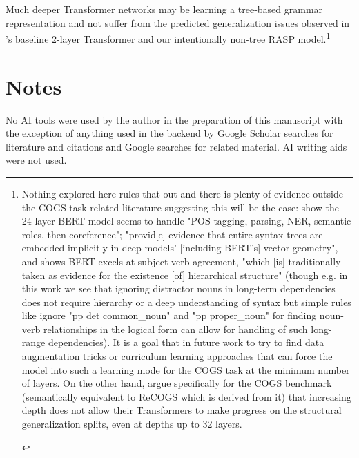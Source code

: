 \documentclass[11pt]{article}
\begin{document}
Much deeper Transformer networks may be learning a tree-based grammar representation and not suffer from the predicted generalization issues observed in \cite{Wu2023}'s baseline 2-layer Transformer and our intentionally non-tree RASP model.\footnote{
\begin{tiny}
Nothing explored here rules that out and there is plenty of evidence outside the COGS task-related literature suggesting this will be the case: \cite{tenney2019bertrediscoversclassicalnlp} show the 24-layer BERT model seems to handle "POS tagging, parsing, NER, semantic roles, then coreference"; \cite{hewitt-manning-2019-structural} "provid[e] evidence that entire syntax trees are embedded implicitly in deep models’ [including BERT's] vector geometry", and \cite{goldberg2019assessingbertssyntacticabilities} shows BERT excels at subject-verb agreement, "which [is] traditionally taken as evidence for
the existence [of] hierarchical structure" (though e.g. in this work we see that ignoring distractor nouns in long-term dependencies does not require hierarchy or a deep understanding of syntax but simple rules like ignore "pp det common\_noun" and "pp proper\_noun" for finding noun-verb relationships in the logical form can allow for handling of such long-range dependencies). It is a goal that in future work to try to find data augmentation tricks or curriculum learning approaches that can force the model into such a learning mode for the COGS task at the minimum number of layers. On the other hand, \cite{petty2024impactdepthcompositionalgeneralization} argue specifically for the COGS benchmark (semantically equivalent to ReCOGS which is derived from it) that increasing depth does not allow their Transformers to make progress on the structural generalization splits, even at depths up to 32 layers.
\end{tiny}
}



\section{Notes}
No AI tools were used by the author in the preparation of this manuscript with the exception of anything used in the backend by Google Scholar searches for literature and citations and Google searches for related material. AI writing aids were not used.

\clearpage
\end{document}
